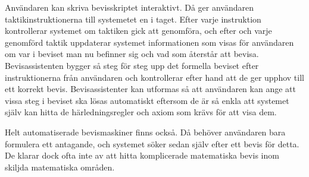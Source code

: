 Användaren kan skriva bevisskriptet interaktivt. Då ger användaren taktikinstruktionerna
till systemetet en i taget. Efter varje instruktion
kontrollerar systemet om taktiken gick att genomföra, och efter
och varje genomförd taktik uppdaterar systemet informationen som visas för användaren
om var i beviset man nu befinner sig och vad som återstår att bevisa.
Bevisassistenten bygger så steg för steg upp det formella beviset efter instruktionerna
från användaren och kontrollerar efter hand att de ger
upphov till ett korrekt bevis.
Bevisassistenter kan utformas så att användaren kan ange att
vissa steg i beviset ska lösas automatiskt eftersom de är så enkla att
systemet själv kan hitta de härledningsregler och axiom som krävs för att visa
dem.


Helt automatiserade bevismaskiner finns också. Då behöver användaren bara
formulera ett antagande, och systemet söker sedan själv efter ett bevis för
detta. De klarar dock ofta inte av att hitta komplicerade matematiska bevis
inom skiljda matematiska områden\cite{geuvers2009proof}\cite{gonthier2009ssreflect}.
